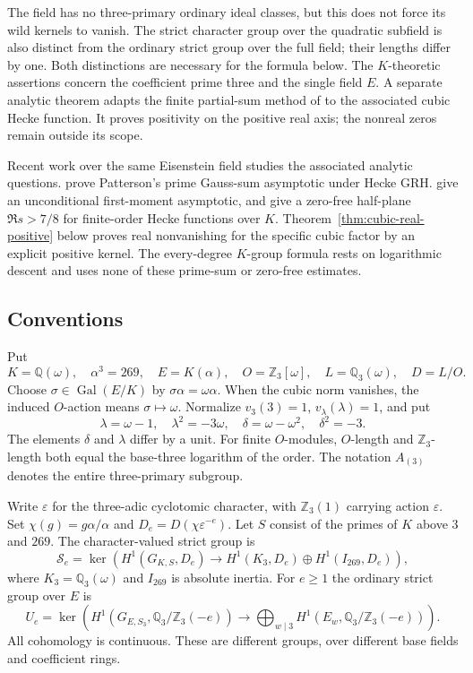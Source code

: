 \documentclass[11pt]{article}
\theoremstyle{remark}\newtheorem{remark}[theorem]{Remark}
\newcommand{\Z}{\mathbb Z}\newcommand{\Q}{\mathbb Q}\newcommand{\F}{\mathbb F}
\newcommand{\Gal}{\operatorname{Gal}}\newcommand{\len}{\operatorname{length}}
\begin{document}
The field has no three-primary ordinary ideal classes, but this does not force its wild kernels to vanish.
The strict character group over the quadratic subfield is also distinct from the ordinary strict group over the full field; their lengths differ by one.
Both distinctions are necessary for the formula below.
The $K$-theoretic assertions concern the coefficient prime three and the single field $E$. A separate analytic theorem adapts the finite partial-sum method of \citet{LouboutinMunsch2013} to the associated cubic Hecke function. It proves positivity on the positive real axis; the nonreal zeros remain outside its scope.

Recent work over the same Eisenstein field studies the associated analytic questions.
\citet[Theorem~1.1, arXiv version~3, p.~3]{DunnRadziwill2024} prove Patterson's prime Gauss-sum asymptotic under Hecke GRH.
\citet[Theorem~1.1, p.~1]{OpenAIFirst2026} give an unconditional first-moment asymptotic, and \citet[Theorem~1.1, p.~4]{OpenAIQuasi2026} give a zero-free half-plane $\Re s>7/8$ for finite-order Hecke functions over $K$.
Theorem~\ref{thm:cubic-real-positive} below proves real nonvanishing for the specific cubic factor by an explicit positive kernel.
The every-degree $K$-group formula rests on logarithmic descent and uses none of these prime-sum or zero-free estimates.

\subsection{Conventions}
Put
\[
 K=\Q(\omega),\quad \alpha^3=269,\quad E=K(\alpha),\quad
 O=\Z_3[\omega],\quad L=\Q_3(\omega),\quad D=L/O.
\]
Choose $\sigma\in\Gal(E/K)$ by $\sigma\alpha=\omega\alpha$.
When the cubic norm vanishes, the induced $O$-action means $\sigma\mapsto\omega$.
Normalize $v_3(3)=1$, $v_\lambda(\lambda)=1$, and put
\[
 \lambda=\omega-1,\quad \lambda^2=-3\omega,\quad
 \delta=\omega-\omega^2,\quad\delta^2=-3.
\]
The elements $\delta$ and $\lambda$ differ by a unit.
For finite $O$-modules, $O$-length and $\Z_3$-length both equal the base-three logarithm of the order.
The notation $A_{(3)}$ denotes the entire three-primary subgroup.

Write $\varepsilon$ for the three-adic cyclotomic character, with $\Z_3(1)$ carrying action $\varepsilon$.
Set $\chi(g)=g\alpha/\alpha$ and $D_e=D(\chi\varepsilon^{-e})$.
Let $S$ consist of the primes of $K$ above $3$ and $269$.
The character-valued strict group is
\begin{equation}
 \mathcal S_e=\ker\left(H^1(G_{K,S},D_e)\longrightarrow
 H^1(K_3,D_e)\oplus H^1(I_{269},D_e)\right),
 \label{eq:charS}
\end{equation}
where $K_3=\Q_3(\omega)$ and $I_{269}$ is absolute inertia.
For $e\geq1$ the ordinary strict group over $E$ is
\begin{equation}
 U_e=\ker\left(H^1(G_{E,S_3},\Q_3/\Z_3(-e))
 \longrightarrow\bigoplus_{w\mid3}H^1(E_w,\Q_3/\Z_3(-e))\right).
 \label{eq:ordinaryS}
\end{equation}
All cohomology is continuous. These are different groups, over different base fields and coefficient rings.
\end{document}
